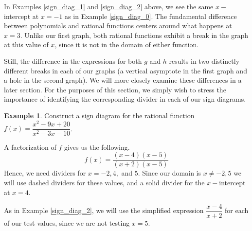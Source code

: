 \documentclass[12pt]{book}
\theoremstyle{definition}
\newtheorem{example}{Example}
\begin{document}
In Examples \ref{sign_diag_1} and \ref{sign_diag_2} above, we see the same $x-$intercept at $x=-1$ as in Example \ref{sign_diag_0}.  The fundamental difference between polynomials and rational functions centers around what happens at $x=3$.  Unlike our first graph, both rational functions exhibit a break in the graph at this value of $x$, since it is not in the domain of either function.
\par
Still, the difference in the expressions for both $g$ and $h$ results in two distinctly different breaks in each of our graphs (a vertical asymptote in the first graph and a hole in the second graph).  We will more closely examine these differences in a later section.  For the purposes of this section, we simply wish to stress the importance of identifying the corresponding divider in each of our sign diagrams.
\begin{example}\label{sign_diag_3}
Construct a sign diagram for the rational function $f(x)=\dfrac{x^2-9x+20}{x^2-3x-10}$.
\par
A factorization of $f$ gives us the following.
$$f(x)=\dfrac{(x-4)(x-5)}{(x+2)(x-5)}$$
Hence, we need dividers for $x=-2,4,$ and $5$.  Since our domain is $x\neq -2,5$ we will use dashed dividers for these values, and a solid divider for the $x-$intercept at $x=4$.
\par
As in Example \ref{sign_diag_2}, we will use the simplified expression $\dfrac{x-4}{x+2}$ for each of our test values, since we are not testing $x=5$.
\begin{center}
\end{center}
\end{example}
\end{document}
